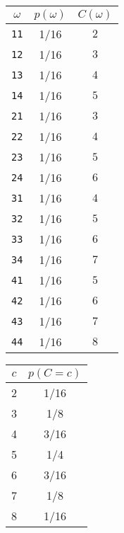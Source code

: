 \begin{center}
\begin{minipage}{0.4\textwidth}
\begin{tabular}{c|c|c}
\textbf{$\omega$} & \textbf{$p(\omega)$} & \textbf{$C(\omega)$}\\
\hline
\texttt{11}		& 1/16 &		$2$\\
\texttt{12}		& 1/16 &		$3$\\
\texttt{13}		& 1/16 &		$4$\\
\texttt{14}		& 1/16 &		$5$\\
\texttt{21}		& 1/16 &		$3$\\
\texttt{22}		& 1/16 &		$4$\\
\texttt{23}		& 1/16 &		$5$\\
\texttt{24}		& 1/16 &		$6$\\
\texttt{31}		& 1/16 &		$4$\\
\texttt{32}		& 1/16 &		$5$\\
\texttt{33}		& 1/16 &		$6$\\
\texttt{34}		& 1/16 &		$7$\\
\texttt{41}		& 1/16 &		$5$\\
\texttt{42}		& 1/16 &		$6$\\
\texttt{43}		& 1/16 &		$7$\\
\texttt{44}		& 1/16 &		$8$\\
\end{tabular}%
%
\begin{tabular}{c|c}
\textbf{$c$} &	\textbf{$p(C=c)$}\\
\hline
2 & 		1/16\\
3 & 		1/8\\
4 & 		3/16\\
5 & 		1/4\\
6 & 		3/16\\
7 & 		1/8\\
8 & 		1/16\\
\end{tabular}%
\end{minipage}\begin{minipage}{0.55\textwidth}
\end{minipage}

\end{center}

